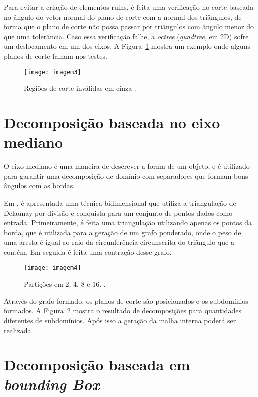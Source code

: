 Para evitar a criação de elementos ruins, é feita uma verificação no corte baseada no ângulo do vetor normal do plano de corte com a normal dos triângulos, de forma que o plano de corte não possa passar por triângulos com ângulo menor do que uma tolerância. Caso essa verificação falhe, a \textit{octree} (\textit{quadtree}, em 2D) sofre um deslocamento em um dos eixos. A Figura~\ref{fig:imagem3} mostra um exemplo onde alguns planos de corte falham nos testes.

 \begin{figure}[htbp]
     \centering
     \texttt{[image: imagem3]}
     \caption{Regiões de corte inválidas em cinza \cite{bib:Larwood03}.}
     \label{fig:imagem3}
 \end{figure}

\section{Decomposição baseada no eixo mediano}

O eixo mediano é uma maneira de descrever a forma de um objeto, e é utilizado para garantir uma decomposição de domínio com separadores que formam bons ângulos com as bordas.

Em \cite{bib:Leonidas06}, é apresentada uma técnica bidimensional que utiliza a triangulação de Delaunay por divisão e conquista para um conjunto de pontos dados como entrada. Primeiramente, é feita uma triangulação utilizando apenas os pontos da borda, que é utilizada para a geração de um grafo ponderado, onde o peso de uma aresta é igual ao raio da circunferência circunscrita do triângulo que a contém. Em seguida é feita uma contração desse grafo. 

 \begin{figure}[htbp]
     \centering
     \texttt{[image: imagem4]}
     \caption{Partições em 2, 4, 8 e 16. \cite{bib:Leonidas06}.}
     \label{fig:imagem4}
 \end{figure}

Através do grafo formado, os planos de corte são posicionados e os subdomínios formados. A Figura~\ref{fig:imagem4} mostra o resultado de decomposições para quantidades diferentes de subdomínios. Após isso a geração da malha interna poderá ser realizada.

\section{Decomposição baseada em \textit{bounding Box}}

